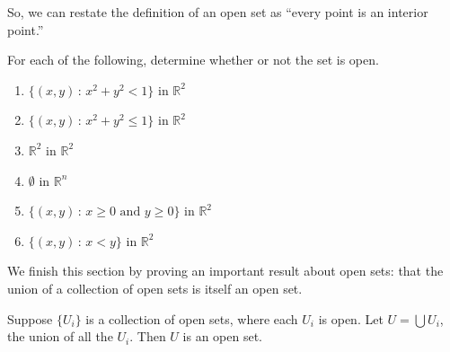 \documentclass{ximera}
\begin{document}
So, we can restate the definition of an open set as ``every point is an interior point.''

\begin{example}
\begin{foldable}
For each of the following, determine whether or not the set is open.

\begin{enumerate}
\item $\{(x,y)\,:\,x^2+y^2<1\}$ in $\mathbb{R}^2$
\begin{multipleChoice}
\end{multipleChoice}			%
\item $\{(x,y)\,:\,x^2+y^2\leq 1\}$ in $\mathbb{R}^2$
\begin{multipleChoice}
\end{multipleChoice}			%
\item $\mathbb{R}^2$ in $\mathbb{R}^2$
\begin{multipleChoice}
\end{multipleChoice}			%
\item $\emptyset$ in $\mathbb{R}^n$
\begin{multipleChoice}
\end{multipleChoice}			%
\item $\{(x,y)\,:\,x\geq 0\textrm{ and }y\geq 0\}$ in $\mathbb{R}^2$
\begin{multipleChoice}
\end{multipleChoice}			%
\item $\{(x,y)\,:\,x<y\}$ in $\mathbb{R}^2$
\begin{multipleChoice}
\end{multipleChoice}			%
\end{enumerate}
\end{foldable}
\end{example}

We finish this section by proving an important result about open sets: that the union of a collection of open sets is itself an open set.

\begin{theorem}
Suppose $\{U_i\}$ is a collection of open sets, where each $U_i$ is open. Let $U=\bigcup U_i$, the union of all the $U_i$. Then $U$ is an open set.
\end{theorem}
\end{document}
